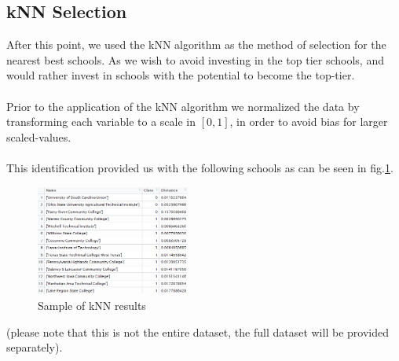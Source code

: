 \documentclass[12pt]{scrartcl}
\begin{document}
	\subsection{kNN Selection}
		After this point, we used the kNN algorithm as the method of selection for the nearest best schools. As we wish to avoid investing in the top tier schools, and would rather invest in schools with the potential to become the top-tier. 
		\\ \\
		Prior to the application of the kNN algorithm we normalized the data by transforming each variable to a scale in $[0,1]$, in order to avoid bias for larger scaled-values.\\
		\\
		This identification provided us with the following schools as can be seen in fig.\ref{fig:kNN}.
		\begin{figure}[H]
			\centering
			\includegraphics[width=0.45\textwidth]{nearest-schools.png}
			\caption{Sample of kNN results}
			\label{fig:kNN}
		\end{figure}
		(please note that this is not the entire dataset, the full dataset will be provided separately).
	
\end{document}
